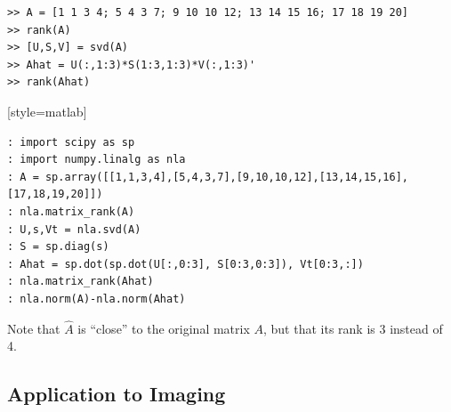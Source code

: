 \begin{matlab}
 \begin{lstlisting}[style=matlab]
>> A = [1 1 3 4; 5 4 3 7; 9 10 10 12; 13 14 15 16; 17 18 19 20]
>> rank(A)
>> [U,S,V] = svd(A)
>> Ahat = U(:,1:3)*S(1:3,1:3)*V(:,1:3)'
>> rank(Ahat)
\end{lstlisting}[style=matlab]
\end{matlab}
\begin{python}
\begin{lstlisting}[style=python]
: import scipy as sp
: import numpy.linalg as nla
: A = sp.array([[1,1,3,4],[5,4,3,7],[9,10,10,12],[13,14,15,16],[17,18,19,20]])
: nla.matrix_rank(A)
: U,s,Vt = nla.svd(A)
: S = sp.diag(s)
: Ahat = sp.dot(sp.dot(U[:,0:3], S[0:3,0:3]), Vt[0:3,:])
: nla.matrix_rank(Ahat)
: nla.norm(A)-nla.norm(Ahat)
\end{lstlisting}

\end{python}
Note that $\widehat A$ is ``close'' to the original matrix $A$, but
that its rank is 3 instead of 4.

\subsection*{Application to Imaging}


